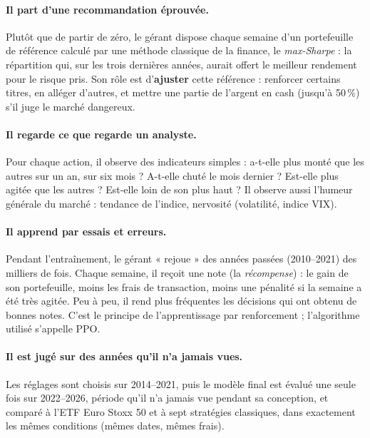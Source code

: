 \documentclass[11pt,a4paper]{article}
\begin{document}
\paragraph{Il part d'une recommandation éprouvée.} Plutôt que de partir de zéro, le gérant dispose chaque semaine
d'un portefeuille de référence calculé par une méthode classique de la finance, le \emph{max-Sharpe} : la
répartition qui, sur les trois dernières années, aurait offert le meilleur rendement pour le risque pris. Son rôle
est d'\textbf{ajuster} cette référence : renforcer certains titres, en alléger d'autres, et mettre une partie de
l'argent en cash (jusqu'à 50\,\%) s'il juge le marché dangereux.

\paragraph{Il regarde ce que regarde un analyste.} Pour chaque action, il observe des indicateurs simples :
a-t-elle plus monté que les autres sur un an, sur six mois ? A-t-elle chuté le mois dernier ? Est-elle plus agitée
que les autres ? Est-elle loin de son plus haut ? Il observe aussi l'humeur générale du marché : tendance de
l'indice, nervosité (volatilité, indice VIX).

\paragraph{Il apprend par essais et erreurs.} Pendant l'entraînement, le gérant « rejoue » des années passées
(2010--2021) des milliers de fois. Chaque semaine, il reçoit une note (la \emph{récompense}) : le gain de son
portefeuille, moins les frais de transaction, moins une pénalité si la semaine a été très agitée. Peu à peu, il
rend plus fréquentes les décisions qui ont obtenu de bonnes notes. C'est le principe de l'apprentissage par
renforcement ; l'algorithme utilisé s'appelle PPO.

\paragraph{Il est jugé sur des années qu'il n'a jamais vues.} Les réglages sont choisis sur 2014--2021, puis le
modèle final est évalué une seule fois sur 2022--2026, période qu'il n'a jamais vue pendant sa conception, et
comparé à l'ETF Euro Stoxx 50 et à sept stratégies classiques, dans exactement les mêmes conditions (mêmes dates,
mêmes frais).
\end{document}
